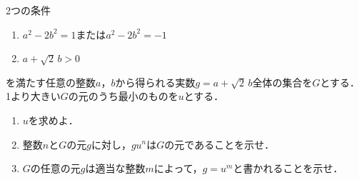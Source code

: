 \documentclass[../../main.tex]{subfiles}
\begin{document}
2つの条件
\begin{enumerate}
  \item $a^2-2b^2=1$または$a^2-2b^2=-1$
  \item $a+\sqrt{2} \, b>0$
\end{enumerate}
を満たす任意の整数$a$，$b$から得られる実数$g=a+\sqrt{2} \, b$全体の集合を$G$とする．
1より大きい$G$の元のうち最小のものを$u$とする．
\begin{enumerate}
  \item $u$を求めよ．
  \item 整数$n$と$G$の元$g$に対し，$gu^n$は$G$の元であることを示せ．
  \item $G$の任意の元$g$は適当な整数$m$によって，$g=u^m$と書かれることを示せ．
\end{enumerate}
\end{document}

